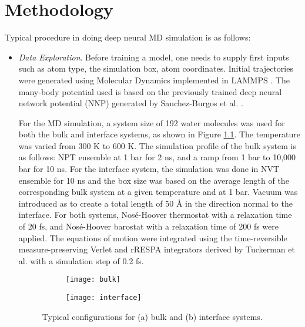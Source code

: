 \chapter{Methodology}
Typical procedure in doing deep neural MD simulation is as follows:

\begin{itemize}
    \item \emph{Data Exploration}. Before training a model, one needs to supply
          first inputs such as	atom type, the simulation box, atom
          coordinates.	 Initial trajectories were generated
          using Molecular Dynamics implemented in
          LAMMPS \cite{LAMMPS}. The many-body potential used is based on the
          previously
          trained deep neural network potential (NNP) generated by
          Sanchez-Burgos et
          al.
          \cite{sanchez2023deep}.

          For the MD simulation, a system size of 192 water molecules was used
          for both
          the bulk and interface systems, as shown in Figure
          \ref{fig:cryst_sctruct}. The
          temperature was varied from 300 K to 600 K. The simulation profile of
          the bulk
          system is as follows: NPT ensemble at 1 bar for 2 ns, and a ramp from
          1 bar to
          10,000 bar for 10 ns. For the interface system, the simulation was
          done in
          NVT
          ensemble for 10 ns and the box size was based on the average length
          of the
          corresponding bulk system at a given temperature and at 1 bar. Vacuum
          was
          introduced as to create a total length of 50 \r{A} in the direction
          normal to
          the interface. For both systems,
          Nosé-Hoover thermostat  with a
          relaxation time of 20 fs, and  Nosé-Hoover barostat with a relaxation
          time of 200 fs were
          applied. The equations of motion were integrated
          using the time-reversible measure-preserving Verlet and rRESPA
          integrators derived by Tuckerman et al. \cite{Tuckerman2006} with a
          simulation step of 0.2 fs.

          \begin{figure}[tbhp]
              \centering
              \begin{subfigure}{0.42\textwidth}
                  \centering
                  \texttt{[image: bulk]}
                  \caption{}
              \end{subfigure}
              \begin{subfigure}{0.42\textwidth}
                  \centering
                  \texttt{[image: interface]}
                  \caption{}
              \end{subfigure}
              \hfill
              \caption{Typical configurations for (a) bulk and (b) interface
                  systems.}
              \label{fig:cryst_sctruct}
          \end{figure}


\end{itemize}
